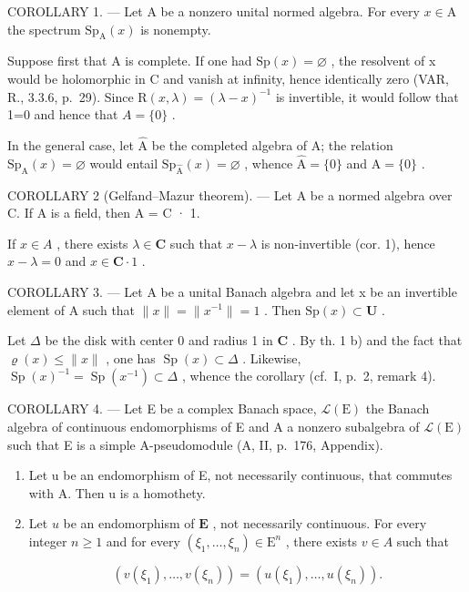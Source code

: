 COROLLARY 1. --- Let A be a nonzero unital normed algebra. For every \(x \in \mathrm{A}\) the spectrum \(\mathrm{Sp}_{\mathrm{A}}(x)\) is nonempty.

Suppose first that A is complete. If one had \(\mathrm{Sp}(x)=\varnothing\) , the resolvent of x would be holomorphic in C and vanish at infinity, hence identically zero (VAR, R., 3.3.6, p.~29). Since \(\mathrm{R}(x,\lambda)=(\lambda-x)^{-1}\) is invertible, it would follow that 1=0 and hence that \(A=\{0\}\) .

In the general case, let \(\widehat{\mathrm{A}}\) be the completed algebra of A; the relation \(\mathrm{Sp}_{\mathrm{A}}(x) = \varnothing\) would entail \(\mathrm{Sp}_{\widehat{\mathrm{A}}} (x) = \varnothing\) , whence \(\widehat{\mathrm{A}} = \{0\}\) and \(\mathrm{A} = \{0\}\) .

COROLLARY 2 (Gelfand–Mazur theorem). --- Let A be a normed algebra over C. If A is a field, then A = C · 1.

If \(x \in A\) , there exists \(\lambda \in \mathbf{C}\) such that \(x - \lambda\) is non-invertible (cor. 1), hence \(x - \lambda = 0\) and \(x \in \mathbf{C} \cdot 1\) .

COROLLARY 3. --- Let A be a unital Banach algebra and let x be an invertible element of A such that \(\|x\|=\|x^{-1}\|=1\) . Then \(\mathrm{Sp}(x)\subset\mathbf{U}\) .

Let \(\Delta\) be the disk with center 0 and radius 1 in \(\mathbf{C}\) . By th. 1 b) and the fact that \(\varrho(x) \leqslant \|x\|\) , one has \(\operatorname{Sp}(x) \subset \Delta\) . Likewise, \(\operatorname{Sp}(x)^{-1} = \operatorname{Sp}(x^{-1}) \subset \Delta\) , whence the corollary (cf.~I, p.~2, remark 4).

COROLLARY 4. --- Let E be a complex Banach space, \(\mathcal{L}(\mathrm{E})\) the Banach algebra of continuous endomorphisms of E and A a nonzero subalgebra of \(\mathcal{L}(\mathrm{E})\) such that E is a simple A-pseudomodule (A, II, p.~176, Appendix).

\begin{enumerate}
\def\labelenumi{\alph{enumi})}
\item
  Let u be an endomorphism of E, not necessarily continuous, that commutes with A. Then u is a homothety.
\item
  Let \(u\) be an endomorphism of \(\mathbf{E}\) , not necessarily continuous. For every integer \(n \geqslant 1\) and for every \((\xi_1, \ldots, \xi_n) \in \mathrm{E}^n\) , there exists \(v \in A\) such that

\[
(v (\xi_ {1}), \dots , v (\xi_ {n})) = (u (\xi_ {1}), \dots , u (\xi_ {n})).
\]

\end{enumerate}

